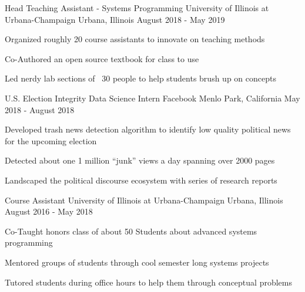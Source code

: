 
\begin{cventries}

  \cventry
    {Head Teaching Assistant - Systems Programming}
    {University of Illinois at Urbana-Champaign}
    {Urbana, Illinois} %
    {August 2018 - May 2019} %
    {
      \begin{cvitems} %
        \item {Organized roughly 20 course assistants to innovate on teaching methods}
        \item {Co-Authored an open source textbook for class to use}
        \item {Led nerdy lab sections of ~30 people to help students brush up on concepts}
      \end{cvitems}
    }

  \cventry
    {U.S. Election Integrity Data Science Intern}
    {Facebook}
    {Menlo Park, California} %
    {May 2018 - August 2018} %
    {
      \begin{cvitems} %
        \item {Developed trash news detection algorithm to identify low quality political news for the upcoming election}
        \item {Detected about one 1 million ``junk'' views a day spanning over 2000 pages}
        \item {Landscaped the political discourse ecosystem with series of research reports}
      \end{cvitems}
    }

   
  \cventry
    {Course Assistant}
    {University of Illinois at Urbana-Champaign}
    {Urbana, Illinois} %
    {August 2016 - May 2018} %
    {
      \begin{cvitems} %
        \item {Co-Taught honors class of about 50 Students about advanced systems programming}
        \item {Mentored groups of students through cool semester long systems projects}
        \item {Tutored students during office hours to help them through conceptual problems}
      \end{cvitems}
    }


\end{cventries}
